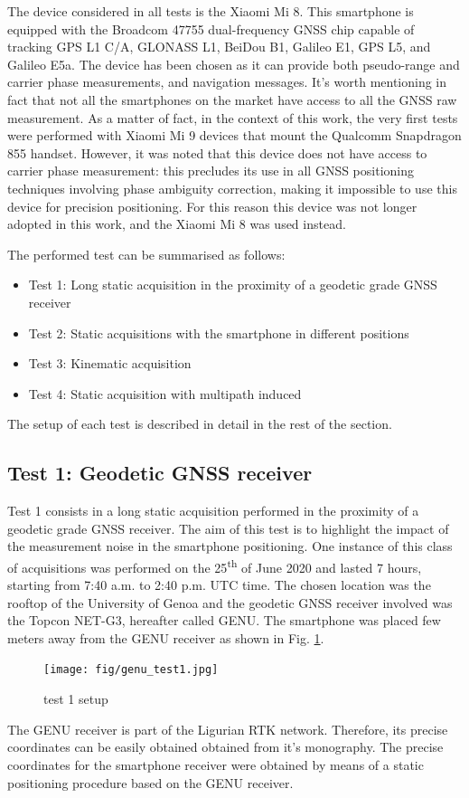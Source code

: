 The device considered in all tests is the Xiaomi Mi 8. This smartphone is equipped with the Broadcom 47755 dual-frequency GNSS chip capable of tracking GPS L1 C/A, GLONASS L1, BeiDou B1, Galileo E1, GPS L5, and Galileo E5a. 
The device has been chosen as it can provide both pseudo-range and carrier phase measurements, and navigation messages. 
It's worth mentioning in fact that not all the smartphones on the market have access to all the GNSS raw measurement. 
As a matter of fact, in the context of this work, the very first tests were performed with Xiaomi Mi 9 devices that mount the Qualcomm Snapdragon 855 handset. However, it was noted that this device does not have access to carrier phase measurement: this precludes its use in all GNSS positioning techniques involving phase ambiguity correction, making it impossible to use this device for precision positioning. For this reason this device was not longer adopted in this work, and the Xiaomi Mi 8 was used instead.

The performed test can be summarised as follows:
\begin{itemize}
\item Test 1: Long static acquisition in the proximity of a geodetic grade GNSS receiver
\item Test 2: Static acquisitions with the smartphone in different positions 
\item Test 3: Kinematic acquisition
\item Test 4: Static acquisition with multipath induced
\end{itemize}
The setup of each test is described in detail in the rest of the section.
\subsection{Test 1: Geodetic GNSS receiver}
Test 1 consists in a long static acquisition performed in the proximity of a geodetic grade GNSS receiver. 
The aim of this test is to highlight the impact of the measurement noise in the smartphone positioning. 
One instance of this class of acquisitions was performed on the 25\textsuperscript{th} of June 2020 and lasted 7 hours, 
starting from 7:40 a.m. to 2:40 p.m. UTC time. The chosen location was the rooftop of the University of Genoa and 
the geodetic GNSS receiver involved was the Topcon NET-G3, hereafter called GENU. 
The smartphone was placed few meters away from the GENU receiver as shown in Fig. \ref{FIG:test1}.
\begin{figure}[H] 
	\centering
	\texttt{[image: fig/genu\_test1.jpg]} 
	\caption{test 1 setup}
	\label{FIG:test1} 
\end{figure}
The GENU receiver is part of the Ligurian RTK network. Therefore, its precise coordinates can be easily 
obtained obtained from it's monography. The precise coordinates for the smartphone receiver were obtained by 
means of a static positioning procedure based on the GENU receiver.
%
